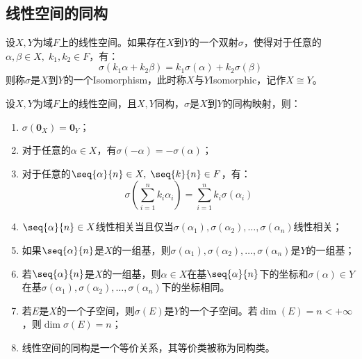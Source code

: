 \subsection{线性空间的同构}
\begin{definition}
	设$X,Y$为域$F$上的线性空间。如果存在$X$到$Y$的一个双射$\sigma$，使得对于任意的$\alpha,\beta\in X,\;k_1,k_2\in F$，有：
	\begin{equation*}
		\sigma(k_1\alpha+k_2\beta)=k_1\sigma(\alpha)+k_2\sigma(\beta)
	\end{equation*}
	则称$\sigma$是$X$到$Y$的一个\gls{Isomorphism}，此时称$X$与$Y$\gls{Isomorphic}，记作$X\cong Y$。
\end{definition}
\begin{property}\label{prop:IsomorphicOfLinearSpace}
	设$X,Y$为域$F$上的线性空间，且$X,Y$同构，$\sigma$是$X$到$Y$的同构映射，则：
	\begin{enumerate}
		\item $\sigma(\mathbf{0}_X)=\mathbf{0}_Y$；
		\item 对于任意的$\alpha\in X$，有$\sigma(-\alpha)=-\sigma(\alpha)$；
		\item 对于任意的$\seq{\alpha}{n}\in X,\;\seq{k}{n}\in F$，有：
		\begin{equation*}
			\sigma\left(\sum_{i=1}^{n}k_i\alpha_i\right)=\sum_{i=1}^{n}k_i\sigma(\alpha_i)
		\end{equation*}
		\item $\seq{\alpha}{n}\in X$线性相关当且仅当$\sigma(\alpha_1),\sigma(\alpha_2),\dots,\sigma(\alpha_n)$线性相关；
		\item 如果$\seq{\alpha}{n}$是$X$的一组基，则$\sigma(\alpha_1),\sigma(\alpha_2),\dots,\sigma(\alpha_n)$是$Y$的一组基；
		\item 若$\seq{\alpha}{n}$是$X$的一组基，则$\alpha\in X$在基$\seq{\alpha}{n}$下的坐标和$\sigma(\alpha)\in Y$在基$\sigma(\alpha_1),\sigma(\alpha_2),\dots,\sigma(\alpha_n)$下的坐标相同。
		\item 若$E$是$X$的一个子空间，则$\sigma(E)$是$Y$的一个子空间。若$\dim(E)=n<+\infty$，则$\dim \sigma(E)=n$；
		\item 线性空间的同构是一个等价关系，其等价类被称为同构类。
	\end{enumerate}
\end{property}
